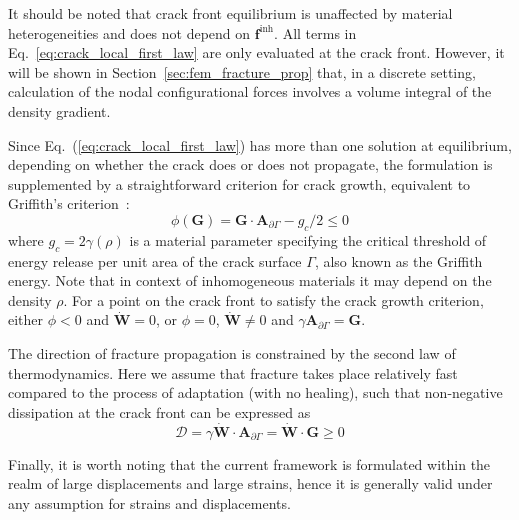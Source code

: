 \documentclass[twocolumn]{svjour3}
\begin{document}
It should be noted that crack front equilibrium is unaffected by material heterogeneities and does not depend on $\mathbf f^{\mathrm {inh}}$. All terms in Eq.~\ref{eq:crack_local_first_law} are only evaluated at the crack front. However, it will be shown in Section~\ref{sec:fem_fracture_prop} that, in a discrete setting, calculation of the nodal configurational forces involves a volume integral of the density gradient.

Since Eq.~(\ref{eq:crack_local_first_law}) has more than one solution at equilibrium, depending on whether the crack 
does or does not propagate, the formulation is supplemented by a straightforward criterion for crack growth, equivalent to Griffith's  criterion~\cite{kaczmarczyk2017energy}:
\begin{equation} \label{eq:grif1}
\phi(\mathbf{G}) = 
\mathbf{G} \cdot \mathbf{A}_{\partial\Gamma} - g_c/2 \leq 0
\end{equation} 
where $g_c=2\gamma(\rho)$ is a material parameter specifying the critical threshold of energy release
per unit area of the crack surface $\Gamma$, also known as the Griffith energy. Note that in context of inhomogeneous materials it may depend on the density $\rho$. For a point on the crack front to satisfy the crack growth criterion, 
either $\phi<0$ and $\dot{\mathbf{W}}=0$, or $\phi=0$, $\dot{\mathbf{W}}\ne 0$ and $\gamma\mathbf{A}_{\partial\Gamma}=\mathbf{G}$. 


The direction of fracture propagation is
constrained by the second law of thermodynamics. Here we assume that fracture takes place
relatively fast compared to the process of adaptation (with no healing), 
such that non-negative dissipation at the crack front can be expressed as
\begin{equation}
	\mathcal{D} = \gamma \dot{\mathbf{W}} \cdot \mathbf{A}_{\partial\Gamma}= \dot{\mathbf{W}} \cdot \mathbf{G}\ge0
\end{equation}

Finally, it is worth noting that the current framework is formulated within 
the realm of large displacements and large strains, hence it 
is generally valid under any assumption for strains and displacements. 
\end{document}
